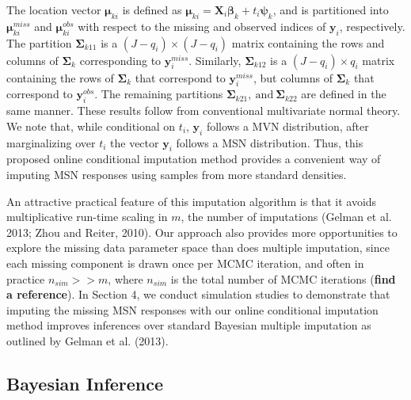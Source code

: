 \documentclass[useAMS,referee]{biom}
\begin{document}
The location vector $\boldsymbol\mu_{ki}$ is defined as $\boldsymbol\mu_{ki} = \mathbf{X}_i \boldsymbol\beta_k + t_i \boldsymbol\psi_k$, and is partitioned into $\boldsymbol\mu_{ki}^{miss}$ and $\boldsymbol\mu_{ki}^{obs}$ with respect to the missing and observed indices of $\mathbf{y}_i$, respectively. The partition $\boldsymbol\Sigma_{k11}$ is a $(J-q_i) \times (J-q_i)$ matrix containing the rows and columns of $\boldsymbol\Sigma_k$ corresponding to $\mathbf{y}^{miss}_{i}$. Similarly, $\boldsymbol\Sigma_{k12}$ is a $(J-q_i) \times q_i$ matrix containing the rows of $\boldsymbol\Sigma_k$ that correspond to $\mathbf{y}^{miss}_{i}$, but columns of $\boldsymbol\Sigma_k$ that correspond to $\mathbf{y}^{obs}_{i}$. The remaining partitions $\boldsymbol\Sigma_{k21}, \ \text{and} \ \boldsymbol\Sigma_{k22}$ are defined in the same manner. These results follow from conventional multivariate normal theory. We note that, while conditional on $t_i$, $\mathbf{y}_i$ follows a MVN distribution, after marginalizing over $t_i$ the vector $\mathbf{y}_i$ follows a MSN distribution. Thus, this proposed online conditional imputation method provides a convenient way of imputing MSN responses using samples from more standard densities.

An attractive practical feature of this imputation algorithm is that it avoids multiplicative run-time scaling in $m$, the number of imputations (Gelman {et al.} 2013; Zhou and Reiter, 2010). Our approach also provides more opportunities to explore the missing data parameter space than does multiple imputation, since each missing component is drawn once per MCMC iteration, and often in practice $n_{sim} >> m$, where $n_{sim}$ is the total number of MCMC iterations (\textbf{find a reference}). In Section 4, we conduct simulation studies to demonstrate that imputing the missing MSN responses with our online conditional imputation method improves inferences over standard Bayesian multiple imputation as outlined by Gelman et al. (2013).

\subsection{Bayesian Inference}
\end{document}
